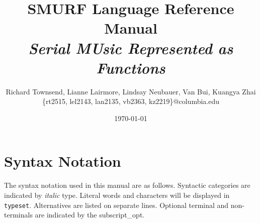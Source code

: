 \documentclass[dvips, 12pt]{article}
\title{{\Huge \bfseries SMURF Language Reference Manual} \\ \Large \it Serial MUsic Represented as Functions \vspace{0.6cm}}
\author{\normalsize Richard Townsend, Lianne Lairmore, Lindsay Neubauer, Van Bui, Kuangya Zhai
	\\ \small \{rt2515, lel2143, lan2135, vb2363, kz2219\}@columbia.edu \vspace{0.6cm}}
\date{\today \vspace{2cm}}
\begin{document}
\maketitle
\clearpage


\tableofcontents

\section{Syntax Notation}
The syntax notation used in this manual are as follows. Syntactic 
categories are indicated by \emph{italic} type. Literal words and 
characters will be displayed in \texttt{typeset}. Alternatives are listed 
on separate lines. Optional terminal and non-terminals are indicated by the
subscript_{opt}. 






\clearpage



\end{document}
